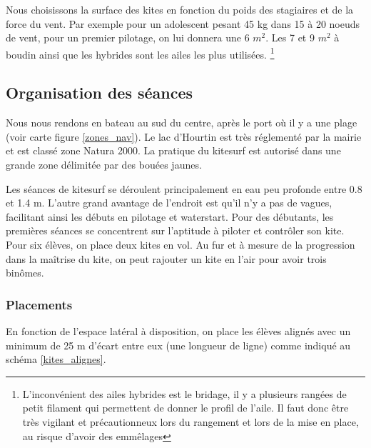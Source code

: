 \documentclass[11pt,a4paper]{report}
\begin{document}
Nous choisissons la surface des kites
en fonction du poids des stagiaires et de la force du vent.
Par exemple pour un adolescent pesant 45 kg dans 15 à 20 noeuds
de vent, pour un premier pilotage, on lui donnera une 6 $m^2$.
Les 7 et 9 $m^2$ à boudin ainsi que  les hybrides sont les ailes
les plus utilisées.
\footnote{L'inconvénient des ailes hybrides est le bridage,
il y a plusieurs rangées de petit filament qui permettent
de donner le profil de l'aile. Il faut donc \^etre très 
vigilant et précautionneux lors du rangement et lors de 
la mise en place, au risque d'avoir des emm\^elages}


\subsection{Organisation des séances}

Nous nous rendons en bateau au sud du centre, après le port o\`u
il y a une plage (voir carte figure \ref{zones_nav}). Le lac 
d'Hourtin est très réglementé par la mairie et est classé
zone Natura 2000\cite{natura2000}. La pratique du kitesurf 
est autorisé dans une  grande zone délimitée par des bouées jaunes. 


Les séances de kitesurf se déroulent principalement en eau peu profonde
entre 0.8 et 1.4 m. L'autre grand avantage de l'endroit est
qu'il n'y a pas de vagues, facilitant ainsi les débuts en pilotage
et waterstart.
Pour des débutants, les premières séances se concentrent sur l'aptitude
à piloter et contrôler son kite. Pour six élèves, on place deux kites en vol.
Au fur et à mesure de la progression dans la ma\^itrise du kite, 
on peut rajouter un kite en l'air pour avoir trois bin\^omes.



\subsubsection{Placements}

En fonction de l'espace latéral à disposition, on place les élèves
alignés avec un minimum de 25 m d'écart entre eux (une longueur de ligne) 
comme indiqué au schéma \ref{kites_alignes}.
\end{document}
